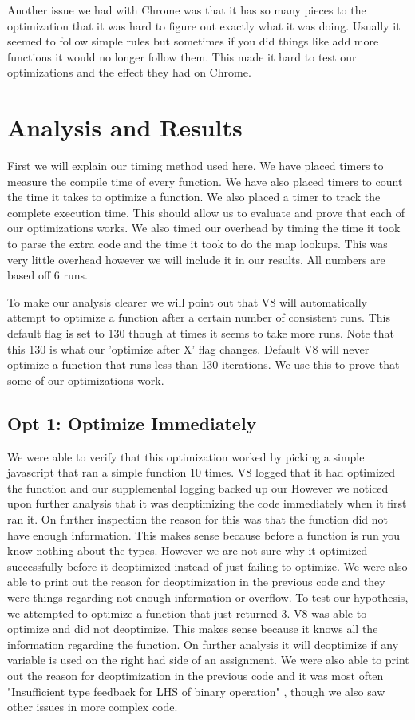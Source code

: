 \documentclass[twocolumn,showpacs,%
  nofootinbib,aps,superscriptaddress,%
  eqsecnum,prd,notitlepage,showkeys,10pt]{revtex4-1}
\begin{document}
Another issue we had with Chrome was that it has so many pieces to the optimization that it was hard to figure out exactly what it was doing. Usually it seemed to follow simple rules but sometimes if you did things like add more functions it would no longer follow them. This made it hard to test our optimizations and the effect they had on Chrome.

\section{Analysis and Results}
First we will explain our timing method used here. We have placed timers to measure the compile time of every function. We have also placed timers to count the time it takes to optimize a function. We also placed a timer to track the complete execution time. This should allow us to evaluate and prove that each of our optimizations works. We also timed our overhead by timing the time it took to parse the extra code and the time it took to do the map lookups. This was very little overhead however we will include it in our results. All numbers are based off 6 runs.

To make our analysis clearer we will point out that V8 will automatically attempt to optimize a function after a certain number of consistent runs. This default flag is set to 130 though at times it seems to take more runs. Note that this 130 is what our 'optimize after X' flag changes. Default V8 will never optimize a function that runs less than 130 iterations. We use this to prove that some of our optimizations work.

\subsection{Opt 1: Optimize Immediately}
We were able to verify that this optimization worked by picking a simple javascript that ran a simple function 10 times. V8 logged that it had optimized the function and our supplemental logging backed up our  However we noticed upon further analysis that it was deoptimizing the code immediately when it first ran it. On further inspection the reason for this was that the function did not have enough information. This makes sense because before a function is run you know nothing about the types. However we are not sure why it optimized successfully before it deoptimized instead of just failing to optimize. We were also able to print out the reason for deoptimization in the previous code and they were things regarding not enough information or overflow. To test our hypothesis, we attempted to optimize a function that just returned 3. V8 was able to optimize and did not deoptimize. This makes sense because it knows all the information regarding the function. On further analysis it will deoptimize if any variable is used on the right had side of an assignment. We were also able to print out the reason for deoptimization in the previous code and it was most often "Insufficient type feedback for LHS of binary operation" , though we also saw other issues in more complex code.
\end{document}
